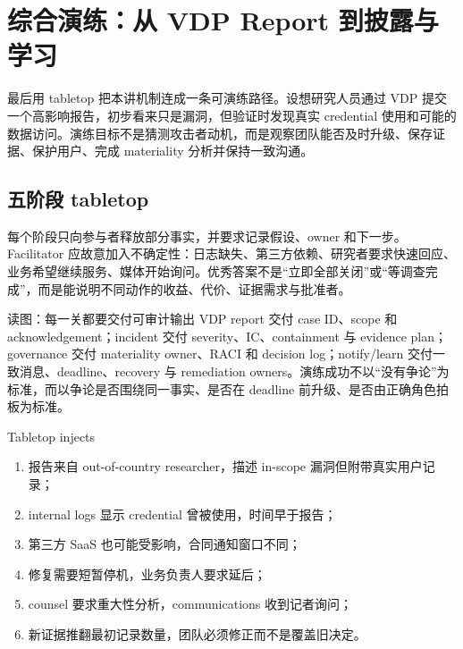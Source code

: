 \section{综合演练：从 VDP Report 到披露与学习}

最后用 tabletop 把本讲机制连成一条可演练路径。设想研究人员通过 VDP 提交一个高影响报告，初步看来只是漏洞，但验证时发现真实 credential 使用和可能的数据访问。演练目标不是猜测攻击者动机，而是观察团队能否及时升级、保存证据、保护用户、完成 materiality 分析并保持一致沟通。

\subsection{五阶段 tabletop}

每个阶段只向参与者释放部分事实，并要求记录假设、owner 和下一步。Facilitator 应故意加入不确定性：日志缺失、第三方依赖、研究者要求快速回应、业务希望继续服务、媒体开始询问。优秀答案不是“立即全部关闭”或“等调查完成”，而是能说明不同动作的收益、代价、证据需求与批准者。


\begin{knowledgebox}{读图：每一关都要交付可审计输出}
VDP report 交付 case ID、scope 和 acknowledgement；incident 交付 severity、IC、containment 与 evidence plan；governance 交付 materiality owner、RACI 和 decision log；notify/learn 交付一致消息、deadline、recovery 与 remediation owners。演练成功不以“没有争论”为标准，而以争论是否围绕同一事实、是否在 deadline 前升级、是否由正确角色拍板为标准。
\end{knowledgebox}

\begin{importantbox}{Tabletop injects}
\begin{enumerate}
  \item 报告来自 out-of-country researcher，描述 in-scope 漏洞但附带真实用户记录；
  \item internal logs 显示 credential 曾被使用，时间早于报告；
  \item 第三方 SaaS 也可能受影响，合同通知窗口不同；
  \item 修复需要短暂停机，业务负责人要求延后；
  \item counsel 要求重大性分析，communications 收到记者询问；
  \item 新证据推翻最初记录数量，团队必须修正而不是覆盖旧决定。
\end{enumerate}
\end{importantbox}

